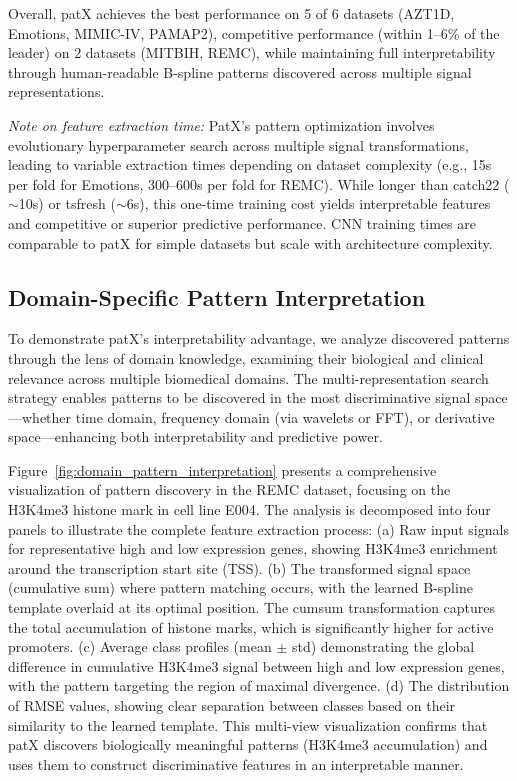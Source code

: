 \documentclass[11pt]{article}
\begin{document}
Overall, patX achieves the best performance on 5 of 6 datasets (AZT1D, Emotions,
MIMIC-IV, PAMAP2), competitive performance (within 1--6\% of the leader) on
2 datasets (MITBIH, REMC), while maintaining full interpretability through
human-readable B-spline patterns discovered across multiple signal
representations.

\textit{Note on feature extraction time:} PatX's pattern optimization involves
evolutionary hyperparameter search across multiple signal transformations, leading
to variable extraction times depending on dataset complexity (e.g., 15s per fold
for Emotions, 300--600s per fold for REMC).
While longer than catch22 ($\sim$10s) or tsfresh ($\sim$6s), this one-time
training cost yields interpretable features and competitive or superior
predictive performance.
CNN training times are comparable to patX for simple datasets but scale with
architecture complexity.

\subsection{Domain-Specific Pattern Interpretation}

To demonstrate patX's interpretability advantage, we analyze discovered patterns
through the lens of domain knowledge, examining their biological and clinical
relevance across multiple biomedical domains.
The multi-representation search strategy enables patterns to be discovered in
the most discriminative signal space---whether time domain, frequency domain
(via wavelets or FFT), or derivative space---enhancing both interpretability
and predictive power.

Figure~\ref{fig:domain_pattern_interpretation} presents a comprehensive
visualization of pattern discovery in the REMC dataset, focusing on the H3K4me3
histone mark in cell line E004.
The analysis is decomposed into four panels to illustrate the complete feature
extraction process:
(a) Raw input signals for representative high and low expression genes, showing
H3K4me3 enrichment around the transcription start site (TSS).
(b) The transformed signal space (cumulative sum) where pattern matching occurs,
with the learned B-spline template overlaid at its optimal position.
The cumsum transformation captures the total accumulation of histone marks,
which is significantly higher for active promoters.
(c) Average class profiles (mean $\pm$ std) demonstrating the global difference
in cumulative H3K4me3 signal between high and low expression genes, with the
pattern targeting the region of maximal divergence.
(d) The distribution of RMSE values, showing clear separation between classes
based on their similarity to the learned template.
This multi-view visualization confirms that patX discovers biologically
meaningful patterns (H3K4me3 accumulation) and uses them to construct
discriminative features in an interpretable manner.
\end{document}
